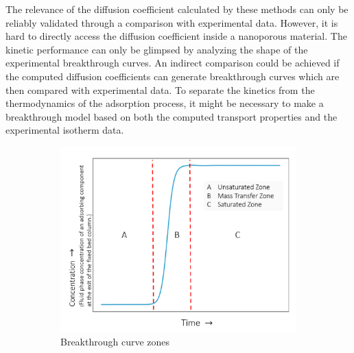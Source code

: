 \documentclass[main]{subfiles}
\begin{document}
The relevance of the diffusion coefficient calculated by these methods can only be reliably validated through a comparison with experimental data. However, it is hard to directly access the diffusion coefficient inside a nanoporous material. The kinetic performance can only be glimpsed by analyzing the shape of the experimental breakthrough curves. An indirect comparison could be achieved if the computed diffusion coefficients can generate breakthrough curves which are then compared with experimental data. To separate the kinetics from the thermodynamics of the adsorption process, it might be necessary to make a breakthrough model based on both the computed transport properties and the experimental isotherm data.

\begin{figure}[ht]
  \centering
  \begin{subfigure}[b]{0.5\textwidth}
    \centering
    \includegraphics[width=\textwidth]{figures/6-perspectives/breakthrough_cuve_zones.png}
    \caption{Breakthrough curve zones}\label{fgr:breakthrough_zones}
  \end{subfigure}
  \hfill
  \begin{subfigure}[b]{0.4\textwidth}
    \centering

\end{subfigure}
\end{figure}
\end{document}
